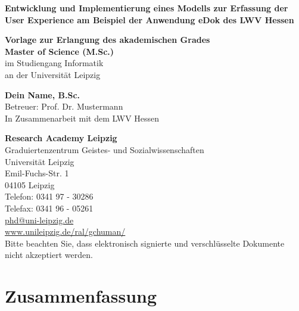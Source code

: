 \documentclass[12pt,a4paper]{article}
\begin{document}
\begin{titlepage}
    \centering
    \vspace*{1cm}

    \Huge\textbf{Entwicklung und Implementierung eines Modells zur Erfassung der User Experience am Beispiel der Anwendung eDok des LWV Hessen}

    \vspace{1.5cm}

    \Large
    \textbf{Vorlage zur Erlangung des akademischen Grades} \\[0.5cm]
    \textbf{Master of Science (M.Sc.)} \\[0.5cm]
    im Studiengang Informatik \\[0.5cm]
    an der Universität Leipzig \\

    \vspace{1.5cm}

    \textbf{Dein Name, B.Sc.} \\[0.5cm]
    Betreuer: Prof. Dr. Mustermann \\[0.5cm]
    In Zusammenarbeit mit dem LWV Hessen

    \vfill

    \textbf{Research Academy Leipzig} \\
    Graduiertenzentrum Geistes- und Sozialwissenschaften \\
    Universität Leipzig \\
    Emil-Fuchs-Str. 1 \\
    04105 Leipzig \\
    Telefon: 0341 97 - 30286 \\
    Telefax: 0341 96 - 05261 \\
    \href{mailto:phd@uni-leipzig.de}{phd@uni-leipzig.de} \\
    \href{https://www.unileipzig.de/ral/gchuman/}{www.unileipzig.de/ral/gchuman/} \\
    \vspace{1cm}
    \small{Bitte beachten Sie, dass elektronisch signierte und verschlüsselte Dokumente nicht akzeptiert werden.}
    
\end{titlepage}

\newpage
\section*{Zusammenfassung}
\end{document}
